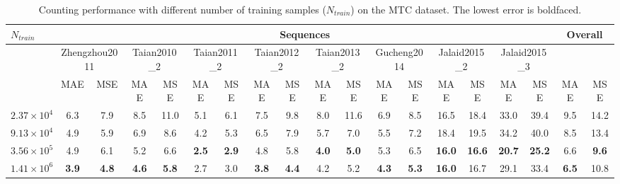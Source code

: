 \documentclass[twocolumn]{bmcart}%
\begin{document}
\begin{table*}[!t] \footnotesize
	\centering
	\caption{Counting performance with different number of training samples ($N_{train}$) on the MTC dataset. The lowest error is boldfaced.}
	\label{tab:num_subimages}
	\renewcommand\arraystretch{1.25}
	\addtolength{\tabcolsep}{-3.5pt}
	\begin{tabular}{l|cc|cc|cc|cc|cc|cc|cc|cc|cc}
		\hline
		$N_{train}$ & \multicolumn{16}{c|}{Sequences} & \multicolumn{2}{c}{Overall}\\
		\hline
		& \multicolumn{2}{c|}{\scriptsize Zhengzhou2011}  & \multicolumn{2}{c|}{\scriptsize Taian2010\_2} & \multicolumn{2}{c|}{\scriptsize Taian2011\_2} & \multicolumn{2}{c|}{ \scriptsize Taian2012\_2} & \multicolumn{2}{c|}{\scriptsize Taian2013\_2} & \multicolumn{2}{c|}{\scriptsize Gucheng2014} & \multicolumn{2}{c|}{\scriptsize Jalaid2015\_2} & \multicolumn{2}{c|}{\scriptsize Jalaid2015\_3} & \\
		& MAE  & MSE  & MAE  & MSE  & MAE  & MSE  & MAE  & MSE  & MAE  & MSE  & MAE  & MSE  & MAE  & MSE  & MAE  & MSE  & MAE  & MSE \\
		$2.37\times10^4$   & 6.3 & 7.9 & 8.5 & 11.0 & 5.1 & 6.1 & 7.5 & 9.8 & 8.0 & 11.6 & 6.9 & 8.5 & 16.5 & 18.4 & 33.0 & 39.4 & 9.5 & 14.2\\
		$9.13\times10^4$   & 4.9 & 5.9 & 6.9 & 8.6 & 4.2 & 5.3 & 6.5 & 7.9 & 5.7 & 7.0 & 5.5 & 7.2 & 18.4 & 19.5 & 34.2 & 40.0 & 8.5 & 13.4\\
		$3.56\times10^5$   & 4.9 & 6.1 & 5.2 & 6.6 & \textbf{2.5} & \textbf{2.9} & 4.8 & 5.8 & \textbf{4.0} & \textbf{5.0} & 5.3 & 6.5 & \textbf{16.0} & \textbf{16.6} & \textbf{20.7} & \textbf{25.2} & 6.6 & \textbf{9.6}\\
		$1.41\times10^6$   & \textbf{3.9} & \textbf{4.8} & \textbf{4.6} & \textbf{5.8} & 2.7 & 3.0 & \textbf{3.8} & \textbf{4.4} & 4.2 & 5.2 & \textbf{4.3} & \textbf{5.3} & \textbf{16.0} & 16.7 & 29.1 & 33.4 & \textbf{6.5} & 10.8\\
		\hline
	\end{tabular}
\end{table*}
\end{document}
